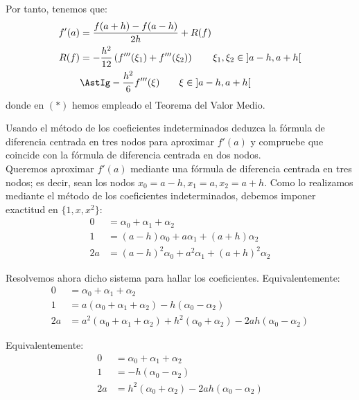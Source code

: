 \begin{ejercicio}
\begin{enumerate}
        Por tanto, tenemos que:
        \begin{align*}
            f'(a) &= \frac{f(a+h) - f(a-h)}{2h} + R(f)\\
            R(f) &= -\dfrac{h^2}{12}\left(f'''(\xi_1) + f'''(\xi_2)\right)\qquad \xi_1, \xi_2\in\left]a-h, a+h\right[
                \\&\AstIg -\dfrac{h^2}{6}f'''(\xi)\qquad \xi\in\left]a-h, a+h\right[
        \end{align*}
        donde en $(\ast)$ hemos empleado el Teorema del Valor Medio.
    \end{enumerate}    
\end{ejercicio}

\begin{ejercicio}\label{ej:2.1.2}
    Usando el método de los coeficientes indeterminados deduzca la fórmula de diferencia centrada en tres nodos para aproximar $f'(a)$ y compruebe que coincide con la fórmula de diferencia centrada en dos nodos.\\

    Queremos aproximar $f'(a)$ mediante una fórmula de diferencia centrada en tres nodos; es decir, sean los nodos $x_0=a-h, x_1=a, x_2=a+h$. Como lo realizamos mediante el método de los coeficientes indeterminados, debemos imponer exactitud en $\{1, x, x^2\}$:
    \begin{align*}
        0 &= \alpha_0 + \alpha_1 + \alpha_2\\
        1 &= (a-h)\alpha_0 + a\alpha_1 + (a+h)\alpha_2\\
        2a &= (a-h)^2\alpha_0 + a^2\alpha_1 + (a+h)^2\alpha_2
    \end{align*}

    Resolvemos ahora dicho sistema para hallar los coeficientes. Equivalentemente:
    \begin{align*}
        0 &= \alpha_0 + \alpha_1 + \alpha_2\\
        1 &= a\left(\alpha_0 + \alpha_1 + \alpha_2\right) - h\left(\alpha_0 - \alpha_2\right)\\
        2a &= a^2\left(\alpha_0 + \alpha_1 + \alpha_2\right) + h^2\left(\alpha_0 + \alpha_2\right) - 2ah\left(\alpha_0 - \alpha_2\right)
    \end{align*}

    Equivalentemente:
    \begin{align*}
        0 &= \alpha_0 + \alpha_1 + \alpha_2\\
        1 &= - h\left(\alpha_0 - \alpha_2\right)\\
        2a &= h^2\left(\alpha_0 + \alpha_2\right) - 2ah\left(\alpha_0 - \alpha_2\right)
    \end{align*}


\end{ejercicio}
